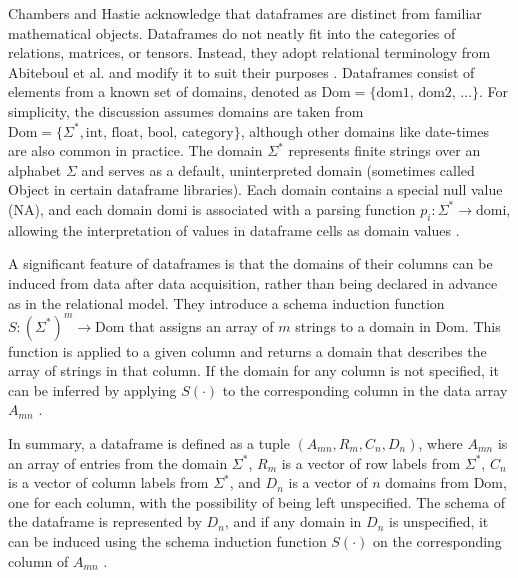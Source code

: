 Chambers and Hastie acknowledge that dataframes are distinct from familiar mathematical objects. Dataframes do not neatly fit into the categories of relations, matrices, or tensors. Instead, they adopt relational terminology from Abiteboul et al. and modify it to suit their purposes \cite{chambers1990statistical}. Dataframes consist of elements from a known set of domains, denoted as \( \text{Dom} = \{\text{dom1, dom2, ...}\} \). For simplicity, the discussion assumes domains are taken from \( \text{Dom} = \{\Sigma^*, \text{int, float, bool, category}\} \), although other domains like date-times are also common in practice. The domain \( \Sigma^* \) represents finite strings over an alphabet \( \Sigma \) and serves as a default, uninterpreted domain (sometimes called Object in certain dataframe libraries). Each domain contains a special null value (NA), and each domain \( \text{domi} \) is associated with a parsing function \( p_i: \Sigma^* \rightarrow \text{domi} \), allowing the interpretation of values in dataframe cells as domain values \cite{abiteboul1995foundations}\cite{petersohn2020scalable}.

A significant feature of dataframes is that the domains of their columns can be induced from data after data acquisition, rather than being declared in advance as in the relational model. They introduce a schema induction function \( S : (\Sigma^*)^m \rightarrow \text{Dom} \) that assigns an array of \( m \) strings to a domain in \( \text{Dom} \). This function is applied to a given column and returns a domain that describes the array of strings in that column. If the domain for any column is not specified, it can be inferred by applying \( S(\cdot) \) to the corresponding column in the data array \( A_{mn} \) \cite{abiteboul1995foundations}\cite{petersohn2020scalable}.

In summary, a dataframe is defined as a tuple \((A_{mn}, R_m, C_n, D_n)\), where \(A_{mn}\) is an array of entries from the domain \(\Sigma^*\), \(R_m\) is a vector of row labels from \(\Sigma^*\), \(C_n\) is a vector of column labels from \(\Sigma^*\), and \(D_n\) is a vector of \(n\) domains from \(\text{Dom}\), one for each column, with the possibility of being left unspecified. The schema of the dataframe is represented by \(D_n\), and if any domain in \(D_n\) is unspecified, it can be induced using the schema induction function \(S(\cdot)\) on the corresponding column of \(A_{mn}\) \cite{abiteboul1995foundations}\cite{petersohn2020scalable}.


